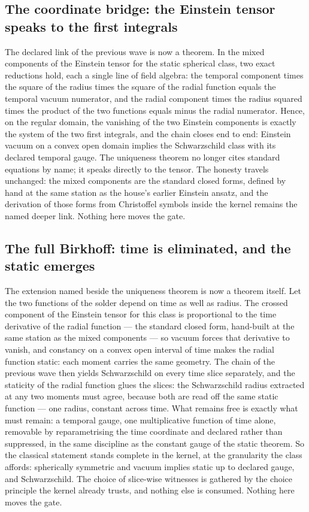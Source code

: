 \documentclass[11pt]{article}
\theoremstyle{definition}\newtheorem{deriv}{Derivation}
\begin{document}
\subsection*{The coordinate bridge: the Einstein tensor speaks to the first integrals}The declared link of the previous wave is now a theorem. In the mixed components of the Einstein tensor for the static spherical class, two exact reductions hold, each a single line of field algebra: the temporal component times the square of the radius times the square of the radial function equals the temporal vacuum numerator, and the radial component times the radius squared times the product of the two functions equals minus the radial numerator. Hence, on the regular domain, the vanishing of the two Einstein components is exactly the system of the two first integrals, and the chain closes end to end: Einstein vacuum on a convex open domain implies the Schwarzschild class with its declared temporal gauge. The uniqueness theorem no longer cites standard equations by name; it speaks directly to the tensor. The honesty travels unchanged: the mixed components are the standard closed forms, defined by hand at the same station as the house's earlier Einstein ansatz, and the derivation of those forms from Christoffel symbols inside the kernel remains the named deeper link. Nothing here moves the gate.

\subsection*{The full Birkhoff: time is eliminated, and the static emerges}The extension named beside the uniqueness theorem is now a theorem itself. Let the two functions of the solder depend on time as well as radius. The crossed component of the Einstein tensor for this class is proportional to the time derivative of the radial function --- the standard closed form, hand-built at the same station as the mixed components --- so vacuum forces that derivative to vanish, and constancy on a convex open interval of time makes the radial function static: each moment carries the same geometry. The chain of the previous wave then yields Schwarzschild on every time slice separately, and the staticity of the radial function glues the slices: the Schwarzschild radius extracted at any two moments must agree, because both are read off the same static function --- one radius, constant across time. What remains free is exactly what must remain: a temporal gauge, one multiplicative function of time alone, removable by reparametrising the time coordinate and declared rather than suppressed, in the same discipline as the constant gauge of the static theorem. So the classical statement stands complete in the kernel, at the granularity the class affords: spherically symmetric and vacuum implies static up to declared gauge, and Schwarzschild. The choice of slice-wise witnesses is gathered by the choice principle the kernel already trusts, and nothing else is consumed. Nothing here moves the gate.
\end{document}
